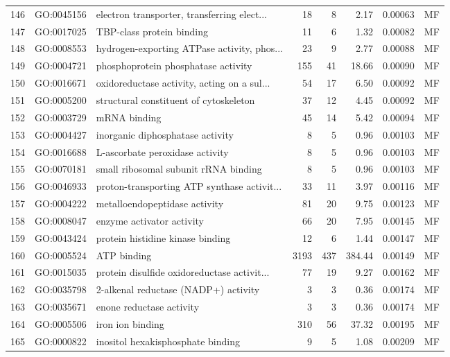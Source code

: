 \documentclass[12pt,oneside,a4paper]{article}
\begin{document}
\begin{longtable}{rllrrrll}
  146 & GO:0045156 & electron transporter, transferring elect... &  18 &   8 & 2.17 & 0.00063 & MF \\ 
  147 & GO:0017025 & TBP-class protein binding &  11 &   6 & 1.32 & 0.00082 & MF \\ 
  148 & GO:0008553 & hydrogen-exporting ATPase activity, phos... &  23 &   9 & 2.77 & 0.00088 & MF \\ 
  149 & GO:0004721 & phosphoprotein phosphatase activity & 155 &  41 & 18.66 & 0.00090 & MF \\ 
  150 & GO:0016671 & oxidoreductase activity, acting on a sul... &  54 &  17 & 6.50 & 0.00092 & MF \\ 
  151 & GO:0005200 & structural constituent of cytoskeleton &  37 &  12 & 4.45 & 0.00092 & MF \\ 
  152 & GO:0003729 & mRNA binding &  45 &  14 & 5.42 & 0.00094 & MF \\ 
  153 & GO:0004427 & inorganic diphosphatase activity &   8 &   5 & 0.96 & 0.00103 & MF \\ 
  154 & GO:0016688 & L-ascorbate peroxidase activity &   8 &   5 & 0.96 & 0.00103 & MF \\ 
  155 & GO:0070181 & small ribosomal subunit rRNA binding &   8 &   5 & 0.96 & 0.00103 & MF \\ 
  156 & GO:0046933 & proton-transporting ATP synthase activit... &  33 &  11 & 3.97 & 0.00116 & MF \\ 
  157 & GO:0004222 & metalloendopeptidase activity &  81 &  20 & 9.75 & 0.00123 & MF \\ 
  158 & GO:0008047 & enzyme activator activity &  66 &  20 & 7.95 & 0.00145 & MF \\ 
  159 & GO:0043424 & protein histidine kinase binding &  12 &   6 & 1.44 & 0.00147 & MF \\ 
  160 & GO:0005524 & ATP binding & 3193 & 437 & 384.44 & 0.00149 & MF \\ 
  161 & GO:0015035 & protein disulfide oxidoreductase activit... &  77 &  19 & 9.27 & 0.00162 & MF \\ 
  162 & GO:0035798 & 2-alkenal reductase (NADP+) activity &   3 &   3 & 0.36 & 0.00174 & MF \\ 
  163 & GO:0035671 & enone reductase activity &   3 &   3 & 0.36 & 0.00174 & MF \\ 
  164 & GO:0005506 & iron ion binding & 310 &  56 & 37.32 & 0.00195 & MF \\ 
  165 & GO:0000822 & inositol hexakisphosphate binding &   9 &   5 & 1.08 & 0.00209 & MF \\ 

\end{longtable}
\end{document}
